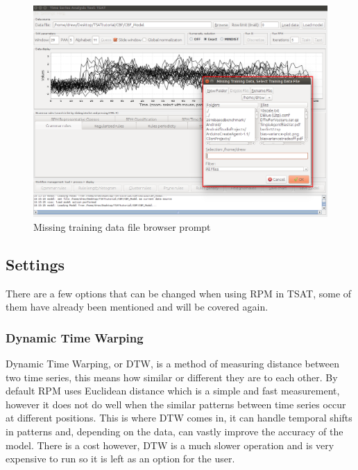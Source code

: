 \documentclass[letterpaper, 12pt]{article}
\begin{document}
\begin{figure}[H]
	\includegraphics[width=\textwidth]{TSAT-load-model-failed-data}
	\caption{Missing training data file browser prompt}
	\label{fig:TSAT-load-model-failed-data}
\end{figure}

\subsection{Settings}
\label{RPMSettings}
There are a few options that can be changed when using RPM in TSAT, some of them have already been mentioned and will be covered again.

\subsubsection{Dynamic Time Warping}
\label{DTW}
Dynamic Time Warping, or DTW, is a method of measuring distance between two time series, this means how similar or different they are to each other. By default RPM uses Euclidean distance which is a simple and fast measurement, however it does not do well when the similar patterns between time series occur at different positions. This is where DTW comes in, it can handle temporal shifts in patterns and, depending on the data, can vastly improve the accuracy of the model. There is a cost however, DTW is a much slower operation and is very expensive to run so it is left as an option for the user. 
\end{document}
